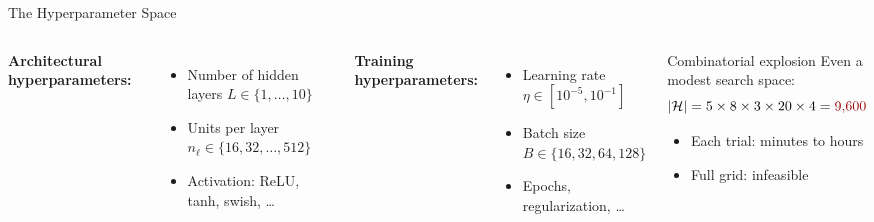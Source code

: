 \documentclass[aspectratio=169,11pt]{beamer}
\newcommand{\emphc}[1]{\textcolor{harvardcrimson}{#1}}
\begin{document}
\begin{frame}{The Hyperparameter Space}
\begin{columns}[T]
\textbf{Architectural hyperparameters:}
\begin{itemize}
    \item Number of hidden layers $L \in \{1, \ldots, 10\}$
    \item Units per layer $n_\ell \in \{16, 32, \ldots, 512\}$
    \item Activation: ReLU, tanh, swish, \ldots
\end{itemize}

\vspace{0.3cm}
\textbf{Training hyperparameters:}
\begin{itemize}
    \item Learning rate $\eta \in [10^{-5}, 10^{-1}]$
    \item Batch size $B \in \{16, 32, 64, 128\}$
    \item Epochs, regularization, \ldots
\end{itemize}

\begin{block}{Combinatorial explosion}
Even a modest search space:
\[
    |\mathcal{H}| = 5 \times 8 \times 3 \times 20 \times 4 = \emphc{9{,}600}
\]
\vspace{-0.2cm}
\begin{itemize}
    \item Each trial: minutes to hours
    \item Full grid: \emphc{infeasible}
\end{itemize}
\end{block}
\end{columns}
\end{frame}
\end{document}
